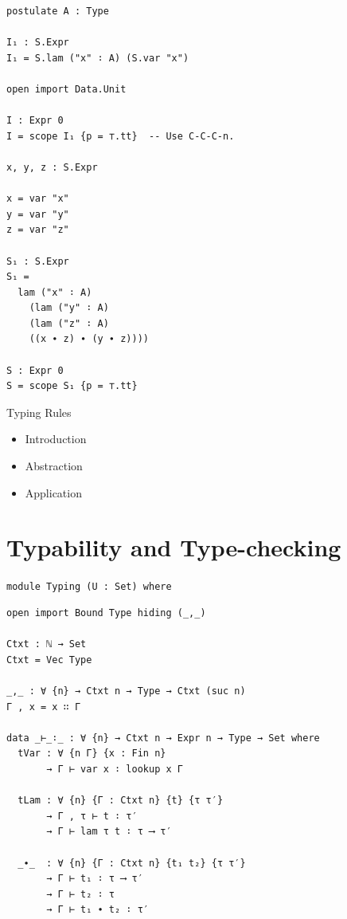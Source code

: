 \documentclass[10pt, xetex, hyperref={pdfpagelabels=false}]{beamer}
\begin{document}
\begin{frame}[fragile]
\begin{verbatim}
postulate A : Type

I₁ : S.Expr
I₁ = S.lam ("x" ∶ A) (S.var "x")

open import Data.Unit

I : Expr 0
I = scope I₁ {p = ⊤.tt}  -- Use C-C-C-n.

x, y, z : S.Expr

x = var "x"
y = var "y"
z = var "z"

S₁ : S.Expr
S₁ =
  lam ("x" ∶ A)
    (lam ("y" ∶ A)
    (lam ("z" ∶ A)
    ((x ∙ z) ∙ (y ∙ z))))

S : Expr 0
S = scope S₁ {p = ⊤.tt}
\end{verbatim}
\end{frame}


\begin{frame}{Typing Rules}
\begin{itemize}
\item Introduction\\
\begin{prooftree}
\end{prooftree}\hfill

\item Abstraction\\
\begin{prooftree}
\end{prooftree}\hfill

\item Application
\begin{prooftree}
\end{prooftree}\hfill
\end{itemize}

\end{frame}

\section{Typability and Type-checking}
\begin{frame}[fragile]{\texttt{module Typing (U : Set) where}}
\begin{verbatim}
open import Bound Type hiding (_,_)

Ctxt : ℕ → Set
Ctxt = Vec Type

_,_ : ∀ {n} → Ctxt n → Type → Ctxt (suc n)
Γ , x = x ∷ Γ

data _⊢_∶_ : ∀ {n} → Ctxt n → Expr n → Type → Set where
  tVar : ∀ {n Γ} {x : Fin n}
       → Γ ⊢ var x ∶ lookup x Γ

  tLam : ∀ {n} {Γ : Ctxt n} {t} {τ τ′}
       → Γ , τ ⊢ t ∶ τ′
       → Γ ⊢ lam τ t ∶ τ ⟶ τ′

  _∙_  : ∀ {n} {Γ : Ctxt n} {t₁ t₂} {τ τ′}
       → Γ ⊢ t₁ ∶ τ ⟶ τ′
       → Γ ⊢ t₂ ∶ τ
       → Γ ⊢ t₁ ∙ t₂ ∶ τ′
\end{verbatim}
\end{frame}
\end{document}
